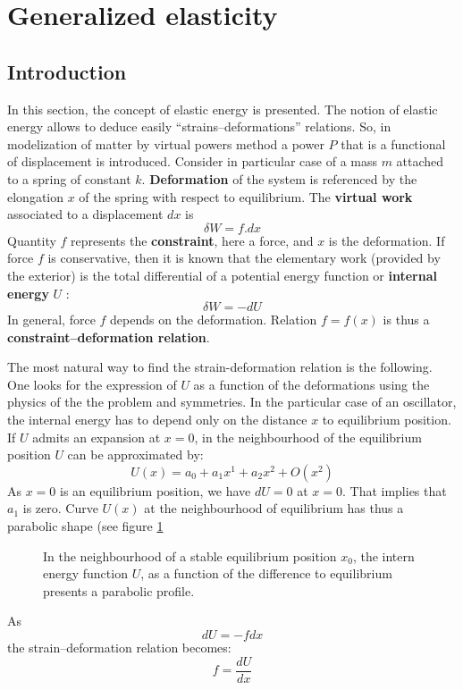 \documentclass[12pt]{book}
\begin{document}
\section{Generalized elasticity}\label{secelastigene} 
\subsection{Introduction}
In this section, the concept of elastic energy is presented.
The notion of elastic energy allows to deduce easily ``strains--deformations''
relations. 
So, in modelization of matter by virtual powers method
a power $P$ that is a functional of displacement is introduced.
Consider in particular case of a mass $m$ attached to a spring of constant
$k$. {\bf Deformation} of the system is referenced by the elongation $x$ of the
spring with respect to equilibrium.
The {\bf virtual work}
associated to a displacement
$dx$ is 
\begin{equation}\label{deltWfdx}
\delta W=f.dx
\end{equation}
Quantity $f$ represents the {\bf constraint}, here a force, and
$x$ is the deformation. If force  $f$ is conservative, then it is known that
the elementary work (provided by the exterior) is the total differential of a
potential energy function or {\bf internal energy} $U$ :
\begin{equation}\label{eqdeltaWdU}
\delta W=-dU
\end{equation}
In general, force $f$ depends on the deformation. Relation $f=f(x)$ is thus a
{\bf constraint--deformation relation}.


The most natural way to find the strain-deformation relation is the
following. One looks for the expression of $U$ as a function of the
deformations using the physics of the the problem and symmetries. In the
particular case of an oscillator, the internal energy has to depend only on
the distance  $x$ to equilibrium position. If $U$ admits an expansion at
$x=0$, in the neighbourhood of the equilibrium position $U$ can be approximated
by:
\begin{equation}
U(x)=a_0+a_1x^1+a_2x^2+O(x^2)
\end{equation}
As $x=0$ is an equilibrium position, we have $dU=0$ at $x=0$. That implies that
$a_1$ is zero. Curve $U(x)$ at the neighbourhood of equilibrium has thus a
parabolic shape (see figure \ref{figparabe}
\begin{figure}[htb]
 \centerline{}   
 \caption{In the neighbourhood of a stable equilibrium position $x_0$, the
   intern energy function $U$, as a function of the difference to equilibrium
   presents a parabolic profile.}
 \label{figparabe}
\end{figure}
As
\begin{equation}
dU=-fdx
\end{equation}
the strain--deformation relation becomes:
\begin{equation}
f=\frac{dU}{dx}
\end{equation}
\end{document}
